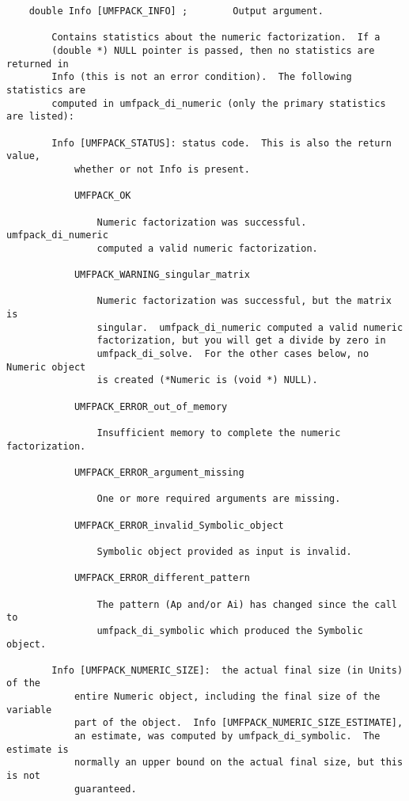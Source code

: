 \documentclass[11pt]{article}
\begin{document}
{\begin{verbatim}
    double Info [UMFPACK_INFO] ;        Output argument.

        Contains statistics about the numeric factorization.  If a
        (double *) NULL pointer is passed, then no statistics are returned in
        Info (this is not an error condition).  The following statistics are
        computed in umfpack_di_numeric (only the primary statistics are listed):

        Info [UMFPACK_STATUS]: status code.  This is also the return value,
            whether or not Info is present.

            UMFPACK_OK

                Numeric factorization was successful.  umfpack_di_numeric
                computed a valid numeric factorization.

            UMFPACK_WARNING_singular_matrix

                Numeric factorization was successful, but the matrix is
                singular.  umfpack_di_numeric computed a valid numeric
                factorization, but you will get a divide by zero in
                umfpack_di_solve.  For the other cases below, no Numeric object
                is created (*Numeric is (void *) NULL).

            UMFPACK_ERROR_out_of_memory

                Insufficient memory to complete the numeric factorization.

            UMFPACK_ERROR_argument_missing

                One or more required arguments are missing.

            UMFPACK_ERROR_invalid_Symbolic_object

                Symbolic object provided as input is invalid.

            UMFPACK_ERROR_different_pattern

                The pattern (Ap and/or Ai) has changed since the call to
                umfpack_di_symbolic which produced the Symbolic object.

        Info [UMFPACK_NUMERIC_SIZE]:  the actual final size (in Units) of the
            entire Numeric object, including the final size of the variable
            part of the object.  Info [UMFPACK_NUMERIC_SIZE_ESTIMATE],
            an estimate, was computed by umfpack_di_symbolic.  The estimate is
            normally an upper bound on the actual final size, but this is not
            guaranteed.


\end{verbatim}}
\end{document}
